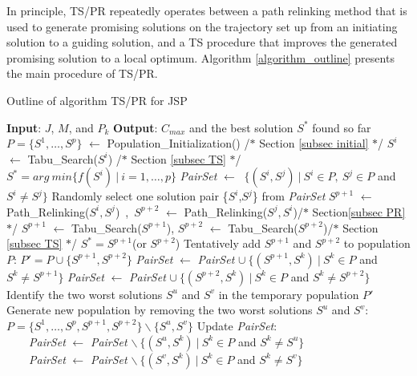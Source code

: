 \documentclass[authoryear,12pt]{elsarticle}
\begin{document}
In principle, TS/PR repeatedly operates between a path relinking method that is used to generate promising solutions on the trajectory set up from an initiating solution to a guiding solution, and a TS procedure that improves the generated promising solution to a local optimum. Algorithm \ref{algorithm_outline} presents the main procedure of TS/PR.

\begin{algorithm}[!hp]
\begin{scriptsize}
 \caption{Outline of algorithm TS/PR for JSP}\label{algorithm_outline}
 \begin{algorithmic}[1]
   \STATE \sf \textbf{Input}: $J$, $M$, and $P_{k}$
   \STATE \textbf{Output}: $C_{max}$ and the best solution $S^*$ found so far
   \STATE $P=\{S^{1},\ldots,S^{p}\}$ $\leftarrow$
   Population\_Initialization() \hfill /$*$ Section \ref{subsec initial} $*$/
       \STATE $S^{i}$ $\leftarrow$ Tabu\_Search($S^{i}$) \hfill /$*$ Section \ref{subsec TS} $*$/
   \ENDFOR
   \STATE $S^{*}=arg \ min \{f(S^{i})\ |\ i=1,\ldots,p\}$
   \STATE \textsl{PairSet} $\leftarrow$  $\ \{(S^{i},S^{j})\  |\ S^{i} \in P,\ S^{j} \in P$ and $S^{i}\neq S^{j}\}$
   \REPEAT
        \STATE Randomly select one solution pair \{$S^{i}$,$S^{j}$\} from \textsl{PairSet}
        \STATE $S^{p+1}$ $\leftarrow$ Path\_Relinking($S^{i},S^{j}$)\ ,\ $S^{p+2}$ $\leftarrow$ Path\_Relinking($S^{j},S^{i}$)\hfill /$*$ Section\ref{subsec PR} $*$/
        \STATE $S^{p+1}$ $\leftarrow$ Tabu\_Search($S^{p+1}$), $S^{p+2}$ $\leftarrow$ Tabu\_Search($S^{p+2}$)\hfill /$*$ Section \ref{subsec TS}
        $*$/
           \STATE $S^*= S^{p+1}$(or $S^{p+2}$)
        \ENDIF
\STATE Tentatively add $S^{p+1}$ and $S^{p+2}$ to population $P$:
        $P'=P\cup \{S^{p+1},S^{p+2}\}$
\STATE \textsl{PairSet} $\leftarrow$ \textsl{PairSet} $\cup \ \{(S^{p+1},S^{k})\  |\ S^{k} \in P$ and $ S^{k} \neq S^{p+1} \}$
        \STATE \textsl{PairSet} $\leftarrow$ \textsl{PairSet} $\cup \ \{(S^{p+2},S^{k})\  |\ S^{k} \in P$ and $S^{k} \neq S^{p+2} \}$
        \STATE Identify the two worst solutions $S^{u}$ and $S^{v}$ in the temporary population $P'$\\
\STATE Generate new population by removing the two worst solutions $S^{u}$ and $S^{v}$:\\
        $P=\{S^{1},\ldots,S^{p},S^{p+1},S^{p+2}\}\backslash \{S^{u},S^{v}\}$
        \STATE Update \textsl{PairSet}:\\
          \ \ \ \ \textsl{PairSet} $\leftarrow$ \textsl{PairSet} $\backslash \ \{(S^{u},S^{k})\  |\ S^{k} \in P$ and $S^{k} \neq S^{u} \}$\\
          \ \ \ \ \textsl{PairSet} $\leftarrow$ \textsl{PairSet} $\backslash \ \{(S^{v},S^{k})\  |\ S^{k} \in P$ and $S^{k} \neq S^{v} \}$
 \end{algorithmic}
 \end{scriptsize}
\end{algorithm}
\end{document}
